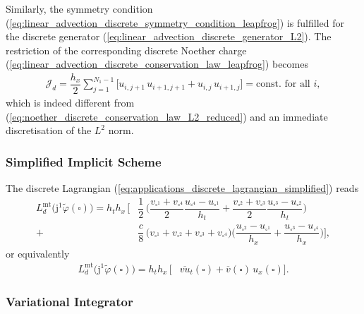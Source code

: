 \documentclass[12pt,a4paper,reqno]{article}
\begin{document}
Similarly, the symmetry condition (\ref{eq:linear_advection_discrete_symmetry_condition_leapfrog}) is fulfilled for the discrete generator (\ref{eq:linear_advection_discrete_generator_L2}). The restriction of the corresponding discrete Noether charge (\ref{eq:linear_advection_discrete_conservation_law_leapfrog}) becomes
\begin{align}\label{eq:noether_discrete_conservation_law_L2_leapfrog}
\mathcal{J}_{d} =
\dfrac{h_{x}}{2} \sum \limits_{j=1}^{N_{1}-1} \bigg[ u_{i,  j+1} \, u_{i+1,j+1} + u_{i,  j  } \, u_{i+1,j } \bigg]
= \text{const. for all $i$} ,
\end{align}
which is indeed different from (\ref{eq:noether_discrete_conservation_law_L2_reduced}) and an immediate discretisation of the $L^{2}$ norm.

\subsubsection{Simplified Implicit Scheme}
\label{sec:linear_advection_simplified_implicit}

The discrete Lagrangian (\ref{eq:applications_discrete_lagrangian_simplified}) reads
\begin{align}\label{eq:linear_advection_discrete_lagrangian_simplified_2}
L_{d}^{\mathrm{mt}} \big( {\ensuremath{\mathrm{j}}}^{1} \tilde{\ensuremath{\varphi}} (\square) \big) = h_{t} h_{x} \, \bigg[ &
\nonumber
\dfrac{1}{2} \, \bigg(
  \dfrac{v_{\square^{1}} + v_{\square^{4}}}{2} \dfrac{u_{\square^{4}} - u_{\square^{1}}}{h_{t}}
+ \dfrac{v_{\square^{2}} + v_{\square^{3}}}{2} \dfrac{u_{\square^{3}} - u_{\square^{2}}}{h_{t}}
\bigg) \\
\nonumber
+ &
\dfrac{c}{8} \,
\bigg( v_{\square^{1}} + v_{\square^{2}} + v_{\square^{3}} + v_{\square^{4}} \bigg )
\bigg( \dfrac{u_{\square^{2}} - u_{\square^{1}}}{h_{x}} + \dfrac{u_{\square^{3}} - u_{\square^{4}}}{h_{x}}
\bigg)
\bigg] ,
\end{align}
or equivalently
\begin{align}
L_{d}^{\mathrm{mt}} \big( {\ensuremath{\mathrm{j}}}^{1} \tilde{\ensuremath{\varphi}} (\square) \big) = h_{t} h_{x} \, \big[ &
\overline{vu}_{t} (\square) + \overline{v} (\square) \, u_{x} (\square)
\big] .
\end{align}

\subsubsection*{Variational Integrator}
\end{document}
